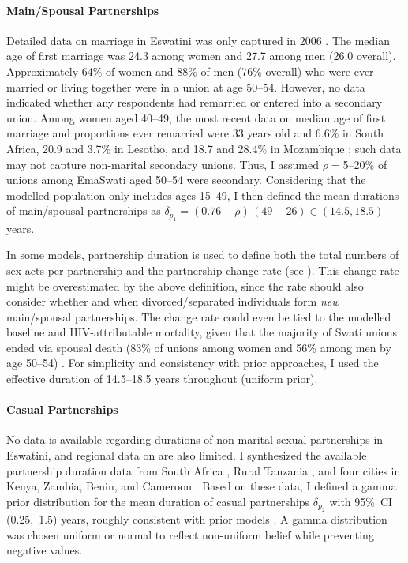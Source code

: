 \paragraph{Main/Spousal Partnerships}
Detailed data on marriage in Eswatini was only captured in 2006 \cite[Table~6.1]{SDHS2006}.
The median age of first marriage was 24.3 among women and 27.7 among men (26.0 overall).
Approximately 64\% of women and 88\% of men (76\% overall) who were ever married or living together
were in a union at age 50--54.
However, no data indicated whether any respondents had remarried or entered into a secondary union.
Among women aged 40--49, the most recent data on
median age of first marriage and proportions ever remarried were
33 years old and 6.6\% in South Africa,
20.9 and 3.7\% in Lesotho, and 18.7 and 28.4\% in Mozambique \cite{John2022};
such data may not capture non-marital secondary unions.
Thus, I assumed $\rho = {}$5--20\% of unions among EmaSwati aged 50--54 were secondary.
Considering that the modelled population only includes ages 15--49,
I then defined the mean durations of main/spousal partnerships as
$\delta_{p_{1}} =  (0.76 - \rho)\,(49 - 26) \in (14.5, 18.5)$ years.
\par
In some models, partnership duration is used to define both
the total numbers of sex acts per partnership and the partnership change rate (see ).
This change rate might be overestimated by the above definition,
since the rate should also consider whether and when
divorced/separated individuals form \emph{new} main/spousal partnerships.
The change rate could even be tied to the modelled baseline and HIV-attributable mortality,
given that the majority of Swati unions ended via spousal death
(83\% of unions among women and 56\% among men by age 50--54) \cite{SDHS2006}.
For simplicity and consistency with prior approaches,
I used the effective duration of 14.5--18.5 years throughout (uniform prior).
\paragraph{Casual Partnerships}
No data is available regarding durations of non-marital sexual partnerships in Eswatini,
and regional data on are also limited.
I synthesized the available partnership duration data from
South Africa \cite{Harrison2008,Hargreaves2009,Nguyen2015},
Rural Tanzania \cite{Nnko2004},
and four cities in Kenya, Zambia, Benin, and Cameroon \cite{Ferry2001}.
Based on these data, I defined a gamma prior distribution for
the mean duration of casual partnerships $\delta_{p_{2}}$ with 95\%~CI (0.25,~1.5) years,
roughly consistent with prior models \cite{Johnson2009}.
A gamma distribution was chosen \vs uniform or normal
to reflect non-uniform belief while preventing negative values.
